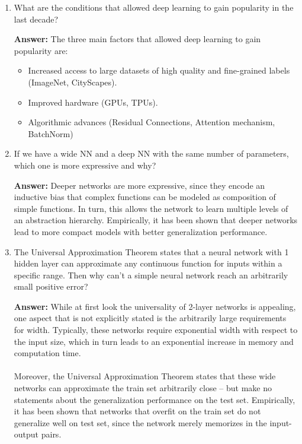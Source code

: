 \documentclass{article}
\newenvironment{QandA}{\begin{enumerate}[label=\arabic*.]}{\end{enumerate}}
\newenvironment{answer}{\par\normalfont \textbf{Answer:}}{}
\begin{document}
\begin{QandA}
\begin{answer}
        (Source: \href{https://en.wikipedia.org/wiki/Minimum_description_length}{Wikipedia})
    \end{answer}

    \item What are the conditions that allowed deep learning to gain popularity in the last decade?
    \begin{answer}
        The three main factors that allowed deep learning to gain popularity are:
        \begin{itemize}
            \item Increased access to large datasets of high quality and fine-grained labels (ImageNet, CityScapes).
            \item Improved hardware (GPUs, TPUs). 
            \item Algorithmic advances (Residual Connections, Attention mechanism, BatchNorm)
        \end{itemize}
    \end{answer}

    \item If we have a wide NN and a deep NN with the same number of parameters, which one is more expressive and why?
    \begin{answer}
        Deeper networks are more expressive, since they encode an inductive bias that complex functions can be modeled as composition of simple functions. In turn, this allows the network to learn multiple levels of an abstraction hierarchy. Empirically, it has been shown that deeper networks lead to more compact models with better generalization performance. 
    \end{answer}

    \item The Universal Approximation Theorem states that a neural network with 1 hidden layer can approximate any continuous function for inputs within a specific range. Then why can’t a simple neural network reach an arbitrarily small positive error?
    \begin{answer}
        While at first look the universality of 2-layer networks is appealing, one aspect that is not explicitly stated is the arbitrarily large requirements for width. Typically, these networks require exponential width with respect to the input size, which in turn leads to an exponential increase in memory and computation time. \\\\
        Moreover, the Universal Approximation Theorem states that these wide networks can approximate the train set arbitrarily close -- but make no statements about the generalization performance on the test set. Empirically, it has been shown that networks that overfit on the train set do not generalize well on test set, since the network merely memorizes in the input-output pairs.
    \end{answer}


\end{QandA}
\end{document}
